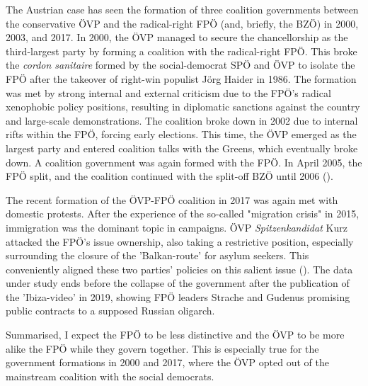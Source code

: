 \documentclass{article}
\begin{document}
The Austrian case has seen the formation of three coalition governments between the conservative ÖVP and the radical-right FPÖ (and, briefly, the BZÖ) in 2000, 2003, and 2017. In 2000, the ÖVP managed to secure the chancellorship as the third-largest party by forming a coalition with the radical-right FPÖ. This broke the \textit{cordon sanitaire} formed by the social-democrat SPÖ and ÖVP to isolate the FPÖ after the takeover of right-win populist Jörg Haider in 1986. The formation was met by strong internal and external criticism due to the FPÖ's radical xenophobic policy positions, resulting in diplomatic sanctions against the country and large-scale demonstrations. The coalition broke down in 2002 due to internal rifts within the FPÖ, forcing early elections. This time, the ÖVP emerged as the largest party and entered coalition talks with the Greens, which eventually broke down. A coalition government was again formed with the FPÖ. In April 2005, the FPÖ split, and the coalition continued with the split-off BZÖ until 2006 (\cite{Luther2010}).\par

The recent formation of the ÖVP-FPÖ coalition in 2017 was again met with domestic protests. After the experience of the so-called "migration crisis" in 2015, immigration was the dominant topic in campaigns. ÖVP \textit{Spitzenkandidat} Kurz attacked the FPÖ's issue ownership, also taking  a restrictive position, especially surrounding the closure of the 'Balkan-route' for asylum seekers. This conveniently aligned these two parties' policies on this salient issue (\cite{Bodlos2018}). The data under study ends before the collapse of the government after the publication of the 'Ibiza-video' in 2019, showing FPÖ leaders Strache and Gudenus promising public contracts to a supposed Russian oligarch.\par 

Summarised, I expect the FPÖ to be less distinctive and the ÖVP to be more alike the FPÖ while they govern together. This is especially true for the government formations in 2000 and 2017, where the ÖVP opted out of the mainstream coalition with the social democrats. \par
\end{document}
